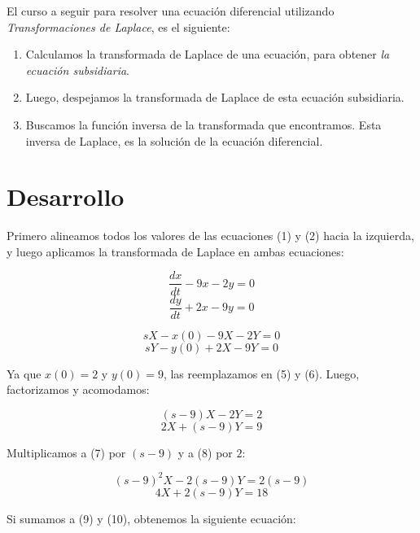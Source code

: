 \documentclass[12pt,letterpaper]{article}
\begin{document}
El curso a seguir para resolver una ecuación diferencial utilizando \textit{Transformaciones de Laplace}, es el siguiente:

\begin{enumerate}
	\item Calculamos la transformada de Laplace de una ecuación, para obtener \textit{la ecuación subsidiaria}.
	\item Luego, despejamos la transformada de Laplace de esta ecuación subsidiaria.
	\item Buscamos la función inversa de la transformada que encontramos. Esta inversa de Laplace, es la solución de la ecuación diferencial.
\end{enumerate}


\section{Desarrollo}
Primero alineamos todos los valores de las ecuaciones (1) y (2) hacia la izquierda, y luego aplicamos la transformada de Laplace en ambas ecuaciones:

\begin{equation}\dfrac{dx}{dt} - 9 x - 2 y = 0\end{equation}
\begin{equation}\dfrac{dy}{dt} + 2 x - 9 y = 0\end{equation}

\begin{equation}sX-x(0)-9X-2Y=0\end{equation}
\begin{equation}sY-y(0)+2X-9Y=0\end{equation}

Ya que $x(0)=2$ y $y(0)=9$, las reemplazamos en (5) y (6). Luego, factorizamos y acomodamos:

\begin{equation}(s-9)X-2Y=2\end{equation}
\begin{equation}2X+(s-9)Y=9\end{equation}

Multiplicamos a (7) por $(s-9)$ y a (8) por $2$:

\begin{equation}(s-9)^2 X-2(s-9)Y=2(s-9)\end{equation}
\begin{equation}4X+2(s-9)Y=18\end{equation}

Si sumamos a (9) y (10), obtenemos la siguiente ecuación:
\end{document}
